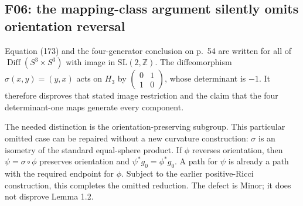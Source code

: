 \documentclass[10pt]{article}
\begin{document}
\subsection*{F06: the mapping-class argument silently omits orientation reversal}
Equation (173) and the four-generator conclusion on p. 54 are written for all of \(\operatorname{Diff}(S^3\times S^3)\) with image in \(\mathrm{SL}(2,\mathbb Z)\). The diffeomorphism \(\sigma(x,y)=(y,x)\) acts on \(H_3\) by \(\left(\begin{smallmatrix}0&1\\1&0\end{smallmatrix}\right)\), whose determinant is \(-1\). It therefore disproves that stated image restriction and the claim that the four determinant-one maps generate every component.\par
The needed distinction is the orientation-preserving subgroup. This particular omitted case can be repaired without a new curvature construction: \(\sigma\) is an isometry of the standard equal-sphere product. If \(\phi\) reverses orientation, then \(\psi=\sigma\circ\phi\) preserves orientation and \(\psi^*g_0=\phi^*g_0\). A path for \(\psi\) is already a path with the required endpoint for \(\phi\). Subject to the earlier positive-Ricci construction, this completes the omitted reduction. The defect is Minor; it does not disprove Lemma 1.2.\par
\end{document}
